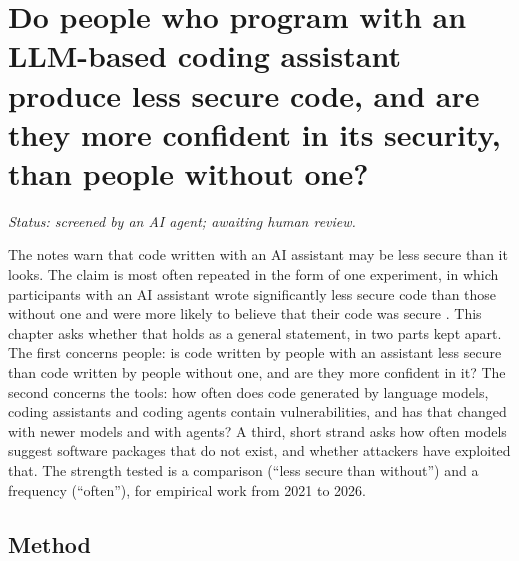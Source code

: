 
\chapter{Do people who program with an LLM-based coding assistant produce
  less secure code, and are they more confident in its security, than
  people without one?}
\label{insecure-code:chapter}

\emph{Status: screened by an AI agent; awaiting human review.}

The notes warn that code written with an AI assistant may be less secure
than it looks.
The claim is most often repeated in the form of one experiment, in which
participants with an AI assistant wrote significantly less secure code than
those without one and were more likely to believe that their code was
secure \autocite{Perry2023Users}.
This chapter asks whether that holds as a general statement, in two parts
kept apart.
The first concerns people: is code written by people with an assistant less
secure than code written by people without one, and are they more confident
in it?
The second concerns the tools: how often does code generated by language
models, coding assistants and coding agents contain vulnerabilities, and has
that changed with newer models and with agents?
A third, short strand asks how often models suggest software packages that
do not exist, and whether attackers have exploited that.
The strength tested is a comparison (\enquote{less secure than without}) and
a frequency (\enquote{often}), for empirical work from 2021 to 2026.

\section{Method}
\label{insecure-code:method}

